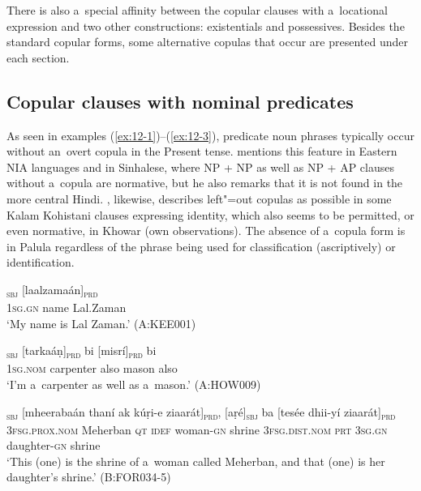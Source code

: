 There is also a~special affinity between the copular clauses with a~locational expression and two other constructions: existentials and possessives. Besides the standard copular forms, some alternative copulas that occur are presented under each section.


\subsection{Copular clauses with nominal predicates}
\label{subsec:12-1-1}


As seen in examples (\ref{ex:12-1})--(\ref{ex:12-3}), predicate noun phrases typically occur without an~overt copula in the Present tense. \citet[337]{masica1991} mentions this feature in Eastern NIA languages and in Sinhalese, where NP + NP as well as NP + AP clauses without a~copula are normative, but he also remarks that it is not found in the more central Hindi. \citet[118--122]{baart1999a}, likewise, describes left"=out copulas as possible in some Kalam Kohistani clauses expressing identity, which also seems to be permitted, or even normative, in Khowar (own observations). The absence of a~copula form is in Palula regardless of the phrase being used for classification (ascriptively) or identification. 

\begin{exe}
\ex
\label{ex:12-1}
\textsubscript{\textsc{sbj}} [laalzamaán]\textsubscript{\textsc{prd}} \\
\textsc{1sg.gn} name Lal.Zaman  \\
\glt `My name is Lal Zaman.' (A:KEE001)
\end{exe}
\begin{exe}
\ex
\label{ex:12-2}
\gll [ma]\textsubscript{\textsc{sbj}} [tarkaáṇ]\textsubscript{\textsc{prd}} bi
     [misrí]\textsubscript{\textsc{prd}} bi \\
\textsc{1sg.nom} carpenter also mason also  \\
\glt `I'm a~carpenter as well as a~mason.' (A:HOW009)

\ex
\label{ex:12-3}
\gll [aní]\textsubscript{\textsc{sbj}} [mheerabaán thaní ak kúṛi-e ziaarát]\textsubscript{\textsc{prd}}, [aṛé]\textsubscript{\textsc{sbj}} ba [tesée dhii-yí ziaarát]\textsubscript{\textsc{prd}} \\
\textsc{3fsg.prox.nom} Meherban \textsc{qt} \textsc{idef} woman-\textsc{gn}  shrine \textsc{3fsg.dist.nom} \textsc{prt} \textsc{3sg.gn} daughter-\textsc{gn}  shrine \\
\glt `This (one) is the shrine of a~woman called Meherban, and that (one) is her daughter's shrine.' (B:FOR034-5)
\end{exe}

